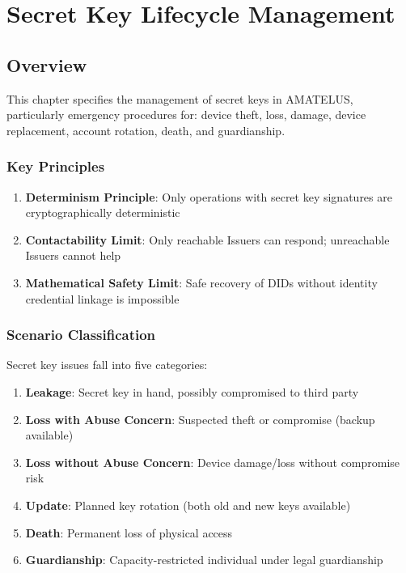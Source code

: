 
\chapter{Secret Key Lifecycle Management}

\section{Overview}

This chapter specifies the management of secret keys in AMATELUS, particularly emergency procedures for:
device theft, loss, damage, device replacement, account rotation, death, and guardianship.

\subsection{Key Principles}

\begin{enumerate}
  \item \textbf{Determinism Principle}: Only operations with secret key signatures are cryptographically deterministic
  \item \textbf{Contactability Limit}: Only reachable Issuers can respond; unreachable Issuers cannot help
  \item \textbf{Mathematical Safety Limit}: Safe recovery of DIDs without identity credential linkage is impossible
\end{enumerate}

\subsection{Scenario Classification}

Secret key issues fall into five categories:

\begin{enumerate}
  \item \textbf{Leakage}: Secret key in hand, possibly compromised to third party
  \item \textbf{Loss with Abuse Concern}: Suspected theft or compromise (backup available)
  \item \textbf{Loss without Abuse Concern}: Device damage/loss without compromise risk
  \item \textbf{Update}: Planned key rotation (both old and new keys available)
  \item \textbf{Death}: Permanent loss of physical access
  \item \textbf{Guardianship}: Capacity-restricted individual under legal guardianship
\end{enumerate}

